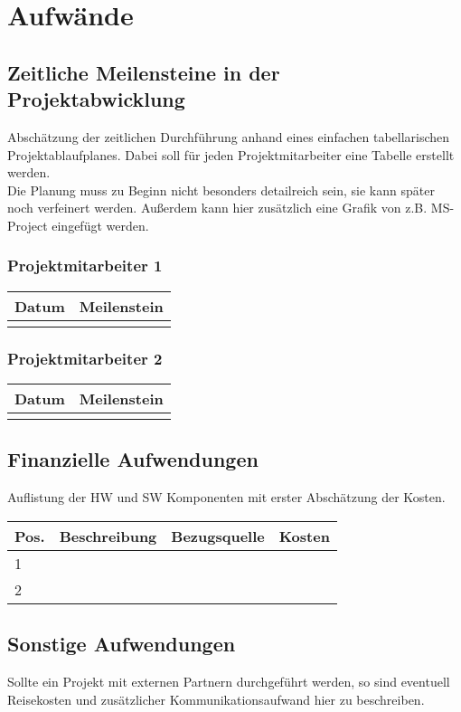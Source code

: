 \documentclass[12pt, draft]{article}
\begin{document}
\section{Aufwände}
\subsection{Zeitliche Meilensteine in der Projektabwicklung}
Abschätzung der zeitlichen Durchführung anhand eines einfachen tabellarischen Projektablaufplanes.
Dabei soll für jeden Projektmitarbeiter eine Tabelle erstellt werden. \\
Die Planung muss zu Beginn nicht besonders detailreich sein, sie kann später noch verfeinert werden.
Außerdem kann hier zusätzlich eine Grafik von z.B. MS-Project eingefügt werden.

\subsubsection{Projektmitarbeiter 1}
\begin{tabularx}{\textwidth}{| l | X |}
    \hline
    \textbf{Datum} & \textbf{Meilenstein} \\
    \hline
     & \\
    \hline
\end{tabularx}

\subsubsection{Projektmitarbeiter 2}
\begin{tabularx}{\textwidth}{| l | X |}
    \hline
    \textbf{Datum} & \textbf{Meilenstein} \\
    \hline
     & \\
    \hline
\end{tabularx}

\subsection{Finanzielle Aufwendungen}
Auflistung der HW und SW Komponenten mit erster Abschätzung der Kosten. \\
\begin{tabularx}{\textwidth}{| p{} | p{} | p{} | X |}
    \hline
    \textbf{Pos.} & \textbf{Beschreibung} & \textbf{Bezugsquelle} & \textbf{Kosten}\\
    \hline
    1 & & & \\
    \hline
    2 & & & \\
    \hline
\end{tabularx}

\subsection{Sonstige Aufwendungen}
Sollte ein Projekt mit externen Partnern durchgeführt werden, so sind eventuell Reisekosten und zusätzlicher Kommunikationsaufwand hier zu beschreiben.

\clearpage
\listoffigures
\end{document}
